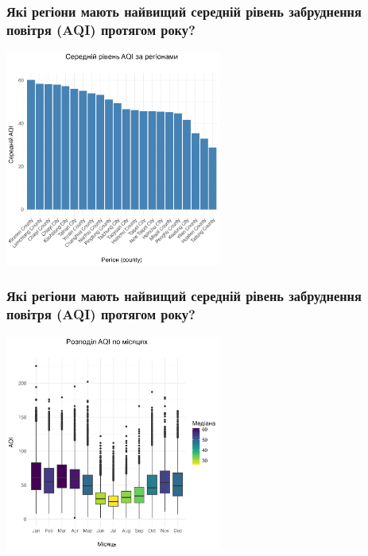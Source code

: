 \documentclass{beamer}
\begin{document}
\begin{frame}
  \frametitle{Які регіони мають найвищий середній рівень забруднення повітря (AQI) протягом року?}

  \begin{center}
    \includegraphics[height=2.8in]{plots/question4/avg_aqi_by_county.png}
  \end{center}
\end{frame}

\begin{frame}
  \frametitle{Які регіони мають найвищий середній рівень забруднення повітря (AQI) протягом року?}

  \begin{center}
    \includegraphics[height=2.8in]{plots/question4/seasonal_change.png}
  \end{center}
\end{frame}
\end{document}
